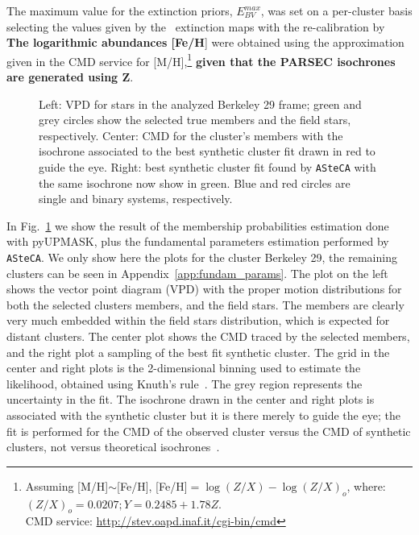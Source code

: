 \documentclass[referee]{aa}
\begin{document}
  \noindent The maximum value for the extinction priors, $E_{BV}^{max}$, was set
  on a per-cluster basis selecting the values given by the~\cite{Schlegel_1998}
  extinction maps with the re-calibration by~\cite{Schlafly_2011}
  \textbf{The logarithmic abundances [Fe/H}] were obtained using the approximation given
  in the CMD service for [M/H],\footnote{Assuming [M/H]$\sim$[Fe/H], [Fe/H]$=\log(Z/X)-\log(Z/X)_{o}$, where:
  $(Z/X)_{o}=0.0207; Y=0.2485+1.78Z$.\\
  CMD service: \url{http://stev.oapd.inaf.it/cgi-bin/cmd}} \textbf{given that the
    PARSEC isochrones are generated using Z}.

  \begin{figure}
   \caption{Left: VPD for stars in the analyzed Berkeley 29
    frame; green and grey circles show the selected true members and the field
    stars, respectively.
    Center: CMD for the cluster's members with the isochrone associated to the
    best synthetic cluster fit drawn in red to guide the eye.
    Right: best synthetic cluster fit found by \texttt{ASteCA} with the same
    isochrone now show in green. Blue and red circles are single and binary
    systems, respectively.}
   \label{fig:BER29_fpars}
  \end{figure}

  In Fig.~\ref{fig:BER29_fpars} we show the result of the membership
  probabilities estimation done with pyUPMASK, plus the fundamental parameters
  estimation performed by \texttt{ASteCA}. We only show here the plots for
  the cluster Berkeley 29, the remaining clusters can be seen in
  Appendix~\ref{app:fundam_params}.
  The plot on the left shows the vector point diagram (VPD) with the proper
  motion distributions for both the selected clusters members, and the field
  stars. The members are clearly very much embedded within the field stars
  distribution, which is expected for distant clusters. The center plot shows
  the CMD traced by the selected members, and the right plot a sampling of the
  best fit synthetic cluster. The grid in the center and right plots is
  the 2-dimensional binning used to estimate the likelihood, obtained using
  Knuth's rule~\citep{Knuth_2006}. The grey region represents the uncertainty
  in the fit. The isochrone drawn in the center and right plots is associated
  with the synthetic cluster but it is there merely to guide the eye; the fit is
  performed for the CMD of the observed cluster versus the CMD of synthetic
  clusters, not versus theoretical isochrones~\citep[this is further
  explained in:][]{Perren_2015,Perren_2017,Perren_2020}.\\
\end{document}
